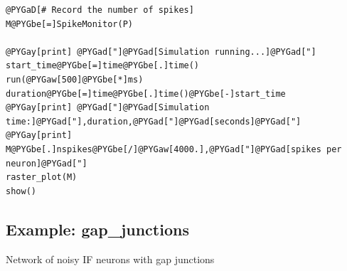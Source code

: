 \documentclass[letterpaper,10pt]{manual}
\begin{document}
\begin{Verbatim}[commandchars=@\[\]]
@PYGaD[# Record the number of spikes]
M@PYGbe[=]SpikeMonitor(P)

@PYGay[print] @PYGad["]@PYGad[Simulation running...]@PYGad["]
start_time@PYGbe[=]time@PYGbe[.]time()
run(@PYGaw[500]@PYGbe[*]ms)
duration@PYGbe[=]time@PYGbe[.]time()@PYGbe[-]start_time
@PYGay[print] @PYGad["]@PYGad[Simulation time:]@PYGad["],duration,@PYGad["]@PYGad[seconds]@PYGad["]
@PYGay[print] M@PYGbe[.]nspikes@PYGbe[/]@PYGaw[4000.],@PYGad["]@PYGad[spikes per neuron]@PYGad["]
raster_plot(M)
show()
\end{Verbatim}

\resetcurrentobjects
{}

\hypertarget{index-34}{}\subsection{Example: gap\_junctions}

Network of noisy IF neurons with gap junctions
\end{document}
